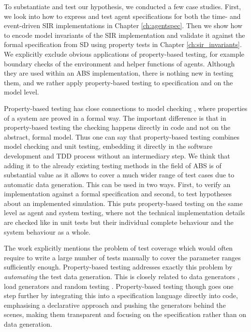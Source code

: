 To substantiate and test our hypothesis, we conducted a few case studies. First, we look into how to express and test agent specifications for both the time- and event-driven SIR implementations in Chapter \ref{ch:agentspec}. Then we show how to encode model invariants of the SIR implementation and validate it against the formal specification from SD using property tests in Chapter \ref{ch:sir_invariants}. We explicitly exclude obvious applications of property-based testing, for example boundary checks of the environment and helper functions of agents. Although they are used within an ABS implementation, there is nothing new in testing them, and we rather apply property-based testing to specification and on the model level.

\medskip

Property-based testing has close connections to model checking \cite{mcmillan_symbolic_1993}, where properties of a system are proved in a formal way. The important difference is that in property-based testing the checking happens directly in code and not on the abstract, formal model. Thus one can say that property-based testing combines model checking and unit testing, embedding it directly in the software development and TDD process without an intermediary step. We think that adding it to the already existing testing methods in the field of ABS is of substantial value as it allows to cover a much wider range of test cases due to automatic data generation. This can be used in two ways. First, to verify an implementation against a formal specification and second, to test hypotheses about an implemented simulation. This puts property-based testing on the same level as agent and system testing, where not the technical implementation details are checked like in unit tests but their individual complete behaviour and the system behaviour as a whole.

The work \cite{onggo_test-driven_2016} explicitly mentions the problem of test coverage which would often require to write a large number of tests manually to cover the parameter ranges sufficiently enough. Property-based testing addresses exactly this problem by \textit{automating} the test data generation. This is closely related to data generators \cite{gurcan_generic_2013}, load generators and random testing \cite{burnstein_practical_2010}. Property-based testing though goes one step further by integrating this into a specification language directly into code, emphasising a declarative approach and pushing the generators behind the scenes, making them transparent and focusing on the specification rather than on data generation. 